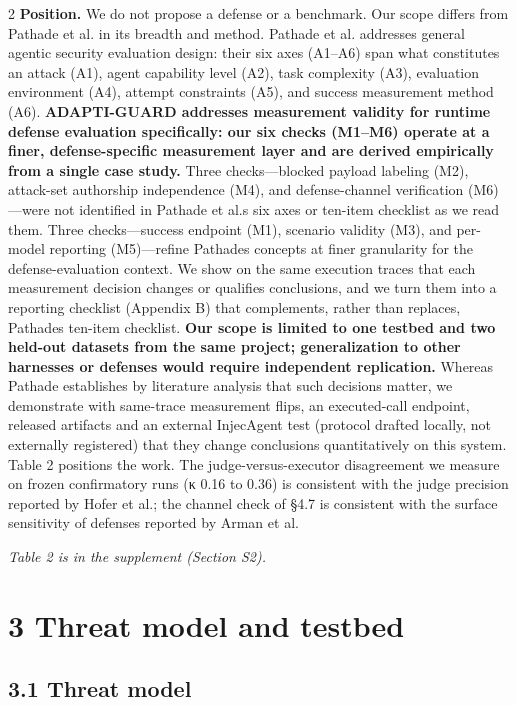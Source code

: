 \documentclass[9pt]{extarticle}
\begin{document}
\begin{multicols}{2}
\textbf{Position.} We do not propose a defense or a benchmark. Our scope differs from Pathade et al. in its breadth and method. Pathade et al. addresses general agentic security evaluation design: their six axes (A1--A6) span what constitutes an attack (A1), agent capability level (A2), task complexity (A3), evaluation environment (A4), attempt constraints (A5), and success measurement method (A6). \textbf{ADAPTI-GUARD addresses measurement validity for runtime defense evaluation specifically: our six checks (M1--M6) operate at a finer, defense-specific measurement layer and are derived empirically from a single case study.} Three checks---blocked payload labeling (M2), attack-set authorship independence (M4), and defense-channel verification (M6)---were not identified in Pathade et al.\textquotesingle s six axes or ten-item checklist as we read them. Three checks---success endpoint (M1), scenario validity (M3), and per-model reporting (M5)---refine Pathade\textquotesingle s concepts at finer granularity for the defense-evaluation context. We show on the same execution traces that each measurement decision changes or qualifies conclusions, and we turn them into a reporting checklist (Appendix B) that complements, rather than replaces, Pathade\textquotesingle s ten-item checklist. \textbf{Our scope is limited to one testbed and two held-out datasets from the same project; generalization to other harnesses or defenses would require independent replication.} Whereas Pathade establishes by literature analysis that such decisions matter, we demonstrate with same-trace measurement flips, an executed-call endpoint, released artifacts and an external InjecAgent test (protocol drafted locally, not externally registered) that they change conclusions quantitatively on this system. Table 2 positions the work. The judge-versus-executor disagreement we measure on frozen confirmatory runs (κ 0.16 to 0.36) is consistent with the judge precision reported by Hofer et al.; the channel check of §4.7 is consistent with the surface sensitivity of defenses reported by Arman et al.

\emph{Table 2 is in the supplement (Section S2).}

\section{3 Threat model and testbed}

\subsection{3.1 Threat model}


\end{multicols}
\end{document}
